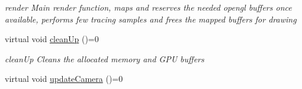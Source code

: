 \begin{DoxyCompactItemize}
\begin{DoxyCompactList}\small\item\em render Main render function, maps and reserves the needed opengl buffers once available, performs few tracing samples and frees the mapped buffers for drawing \end{DoxyCompactList}\item 
\hypertarget{classvRenderer_a7d9cedd13f2d3e87477a570af14ed7cf}{virtual void \hyperlink{classvRenderer_a7d9cedd13f2d3e87477a570af14ed7cf}{clean\-Up} ()=0}\label{classvRenderer_a7d9cedd13f2d3e87477a570af14ed7cf}

\begin{DoxyCompactList}\small\item\em clean\-Up Cleans the allocated memory and G\-P\-U buffers \end{DoxyCompactList}\item 
\hypertarget{classvRenderer_a19141ca681f34f6ae43919087e6cd83c}{virtual void \hyperlink{classvRenderer_a19141ca681f34f6ae43919087e6cd83c}{update\-Camera} ()=0}\label{classvRenderer_a19141ca681f34f6ae43919087e6cd83c}


\end{DoxyCompactItemize}
